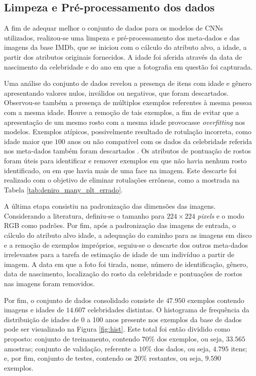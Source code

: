 \subsection{Limpeza e Pré-processamento dos dados}

A fim de adequar melhor o conjunto de dados para os modelos de CNNs utilizados, realizou-se uma limpeza e pré-processamento dos meta-dados e das imagens da base IMDb, que se iniciou com o cálculo do atributo alvo, a idade, a partir dos atributos originais fornecidos. A idade foi aferida através da data de nascimento da celebridade e do ano em que a fotografia em questão foi capturada.

Uma análise do conjunto de dados revelou a presença de itens com idade e gênero apresentando valores nulos, inválidos ou negativos, que foram descartados. Observou-se também a presença de múltiplos exemplos referentes à mesma pessoa com a mesma idade. Houve a remoção de tais exemplos, a fim de evitar que a apresentação de um mesmo rosto com a mesma idade provocasse \emph{overfitting} nos modelos. Exemplos atípicos, possivelmente resultado de rotulação incorreta, como idade maior que $100$ anos ou não compatível com os dados da celebridade referida nos meta-dados também foram descartados . Os atributos de pontuação de rostos foram úteis para identificar e remover exemplos em que não havia nenhum rosto identificado, ou em que havia mais de uma face na imagem. Este descarte foi realizado com o objetivo de eliminar rotulações errôneas, como a mostrada na Tabela \ref{tab:deniro_many_plt_errado}.

A última etapa consistiu na padronização das dimensões das imagens. Considerando a literatura, definiu-se o tamanho para $224 \times 224$ \emph{pixels} e o modo RGB como padrões. Por fim, após a padronização das imagens de entrada, o cálculo do atributo alvo idade, a adequação do caminho para as imagens em disco e a remoção de exemplos impróprios, seguiu-se o descarte dos outros meta-dados irrelevantes para a tarefa de estimação de idade de um indivíduo a partir de imagem. A data em que a foto foi tirada, nome, número de identificação, gênero, data de nascimento, localização do rosto da celebridade e pontuações de rostos nas imagens foram removidos.

Por fim, o conjunto de dados consolidado consiste de $47.950$ exemplos contendo imagens e idades de $14.607$ celebridades distintas. O histograma de frequência da distribuição de idades de 0 a 100 anos presente nos exemplos da base de dados pode ser visualizado na Figura \ref{fig:hist}. Este total foi então dividido como proposto: conjunto de treinamento, contendo $70\%$ dos exemplos, ou seja, $33.565$ amostras; conjunto de validação, referente a $10\%$ dos dados, ou seja, $4.795$ itens; e, por fim, conjunto de testes, contendo os $20\%$ restantes, ou seja, $9.590$ exemplos.

